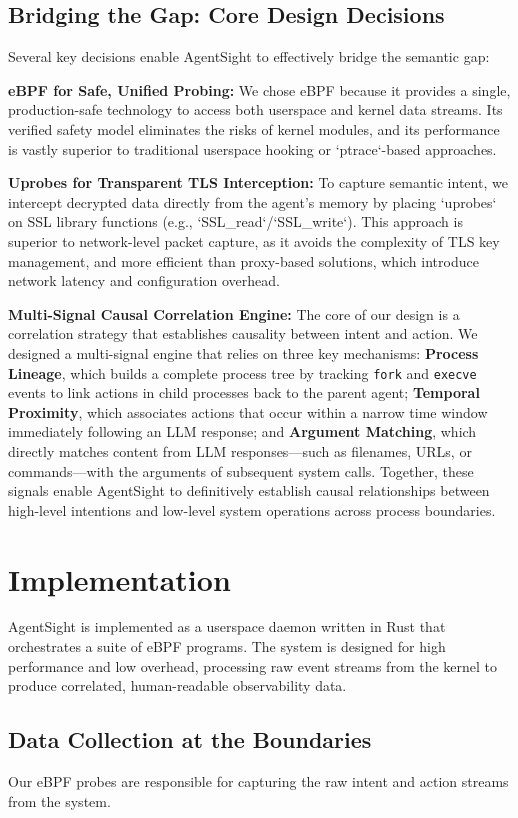 \subsection{Bridging the Gap: Core Design Decisions}
Several key decisions enable AgentSight to effectively bridge the semantic gap:

\textbf{eBPF for Safe, Unified Probing:} We chose eBPF because it provides a single, production-safe technology to access both userspace and kernel data streams. Its verified safety model eliminates the risks of kernel modules, and its performance is vastly superior to traditional userspace hooking or `ptrace`-based approaches.

\textbf{Uprobes for Transparent TLS Interception:} To capture semantic intent, we intercept decrypted data directly from the agent's memory by placing `uprobes` on SSL library functions (e.g., `SSL_read`/`SSL_write`). This approach is superior to network-level packet capture, as it avoids the complexity of TLS key management, and more efficient than proxy-based solutions, which introduce network latency and configuration overhead.

\textbf{Multi-Signal Causal Correlation Engine:} The core of our design is a correlation strategy that establishes causality between intent and action. We designed a multi-signal engine that relies on three key mechanisms: \textbf{Process Lineage}, which builds a complete process tree by tracking \texttt{fork} and \texttt{execve} events to link actions in child processes back to the parent agent; \textbf{Temporal Proximity}, which associates actions that occur within a narrow time window immediately following an LLM response; and \textbf{Argument Matching}, which directly matches content from LLM responses—such as filenames, URLs, or commands—with the arguments of subsequent system calls. Together, these signals enable AgentSight to definitively establish causal relationships between high-level intentions and low-level system operations across process boundaries.

\section{Implementation}
AgentSight is implemented as a userspace daemon written in Rust that orchestrates a suite of eBPF programs. The system is designed for high performance and low overhead, processing raw event streams from the kernel to produce correlated, human-readable observability data.

\subsection{Data Collection at the Boundaries}
Our eBPF probes are responsible for capturing the raw intent and action streams from the system.

